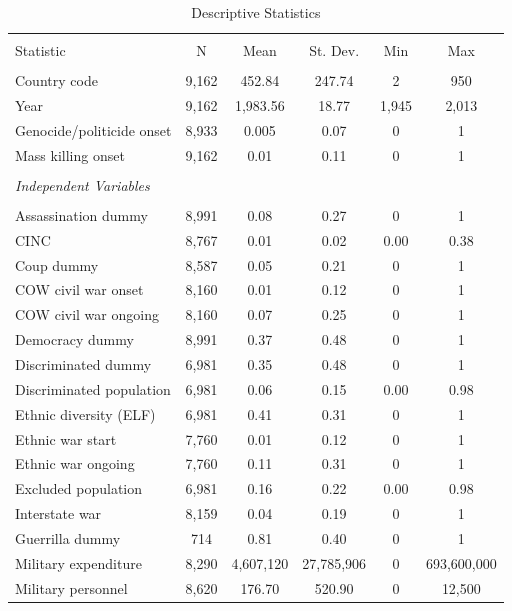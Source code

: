 \documentclass[a4paper,12pt]{article}
\begin{document}
\begin{table}[!htbp] \centering 
  \caption{Descriptive Statistics} 
  \label{tab:mk-ds} 
\footnotesize 
\begin{tabular}{@{\extracolsep{5pt}}lccccc} 
\\[-1.8ex]\hline 
\hline \\[-1.8ex] 
Statistic & \multicolumn{1}{c}{N} & \multicolumn{1}{c}{Mean} & \multicolumn{1}{c}{St. Dev.} & \multicolumn{1}{c}{Min} & \multicolumn{1}{c}{Max} \\ 
\hline \\[-1.8ex] 
Country code & 9,162 & 452.84 & 247.74 & 2 & 950 \\ 
Year & 9,162 & 1,983.56 & 18.77 & 1,945 & 2,013 \\ 
Genocide/politicide onset & 8,933 & 0.005 & 0.07 & 0 & 1\\ 
Mass killing onset & 9,162 & 0.01 & 0.11 & 0 & 1 \\ 
&&&&&\\
\textit{Independent Variables} & & & & \\
&&&&&\\
Assassination dummy & 8,991 & 0.08 & 0.27 & 0 & 1 \\ 
CINC & 8,767 & 0.01 & 0.02 & 0.00 & 0.38 \\ 
Coup dummy & 8,587 & 0.05 & 0.21 & 0 & 1 \\ 
COW civil war onset & 8,160 & 0.01 & 0.12 & 0 & 1 \\ 
COW civil war ongoing & 8,160 & 0.07 & 0.25 & 0 & 1 \\ 
Democracy dummy & 8,991 & 0.37 & 0.48 & 0 & 1 \\ 
Discriminated dummy & 6,981 & 0.35 & 0.48 & 0 & 1 \\ 
Discriminated population & 6,981 & 0.06 & 0.15 & 0.00 & 0.98 \\ 
Ethnic diversity (ELF) & 6,981 & 0.41 & 0.31 & 0 & 1 \\ 
Ethnic war start & 7,760 & 0.01 & 0.12 & 0 & 1 \\ 
Ethnic war ongoing & 7,760 & 0.11 & 0.31 & 0 & 1 \\ 
Excluded population & 6,981 & 0.16 & 0.22 & 0.00 & 0.98 \\ 
Interstate war & 8,159 & 0.04 & 0.19 & 0 & 1 \\ 
Guerrilla dummy & 714 & 0.81 & 0.40 & 0 & 1 \\ 
Military expenditure & 8,290 & 4,607,120 & 27,785,906 & 0 & 693,600,000 \\ 
Military personnel & 8,620 & 176.70 & 520.90 & 0 & 12,500 \\ 

\end{tabular}
\end{table}
\end{document}
